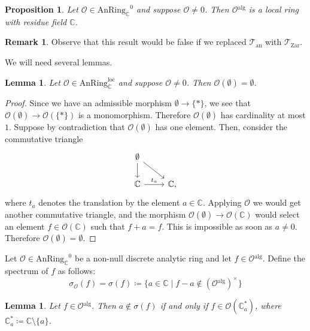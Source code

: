 \documentclass[12pt,a4paper,reqno]{amsart}
\theoremstyle{plain}
\newtheorem{lem}[thm]{Lemma}
\newtheorem{prop}[thm]{Proposition}
\theoremstyle{definition}
\newtheorem{rem}[thm]{Remark}
\theoremstyle{remark}
\numberwithin{equation}{section}
\begin{document}
\begin{prop} \label{prop:discrete_analytic_rings_augmented}
	Let ${\mathcal O} \in {\mathrm{AnRing}_{\mathbb C}}^0$ and suppose ${\mathcal O} \ne 0$. Then ${\mathcal O}{^\mathrm{alg}}$ is a local ring with residue field $\mathbb C$.
\end{prop}

\begin{rem}
	Observe that this result would be false if we replaced ${{\mathcal T}_{\mathrm{an}}}$ with ${\mathcal T}_{\mathrm{Zar}}$.
\end{rem}

We will need several lemmas.

\begin{lem}
	Let ${\mathcal O} \in {\mathrm{AnRing}^{\mathrm{loc}}_{\mathbb C}}$ and suppose ${\mathcal O} \ne 0$. Then ${\mathcal O}(\emptyset) = \emptyset$.
\end{lem}

\begin{proof}
	Since we have an admissible morphism $\emptyset \to \{*\}$, we see that ${\mathcal O}(\emptyset) \to {\mathcal O}(\{*\})$ is a monomorphism.
	Therefore ${\mathcal O}(\emptyset)$ has cardinality at most $1$. Suppose by contradiction that ${\mathcal O}(\emptyset)$ has one element.
	Then, consider the commutative triangle
	\[ \begin{tikzcd}
	\emptyset \arrow{d} \arrow{dr} \\
	\mathbb C \arrow{r}{t_a} & \mathbb C ,
	\end{tikzcd} \]
	where $t_a$ denotes the translation by the element $a \in \mathbb C$. Applying ${\mathcal O}$ we would get another commutative triangle, and the morphism ${\mathcal O}(\emptyset) \to {\mathcal O}(\mathbb C)$ would select an element $f \in {\mathcal O}(\mathbb C)$ such that $f + a = f$. This is impossible as soon as $a \ne 0$. Therefore ${\mathcal O}(\emptyset) = \emptyset$.
\end{proof}

Let ${\mathcal O} \in {\mathrm{AnRing}_{\mathbb C}}^0$ be a non-null discrete analytic ring and let $f \in {\mathcal O}{^\mathrm{alg}}$. Define the spectrum of $f$ as follows:
\[ \sigma_{\mathcal O}(f) = \sigma(f) \coloneqq \{a \in \mathbb C \mid f - a \not \in ({\mathcal O}{^\mathrm{alg}})^\times\} \]

\begin{lem} \label{lem:discrete_analytic_rings_invertible_elements}
	Let $f \in {\mathcal O}{^\mathrm{alg}}$. Then $a \not \in \sigma(f)$ if and only if $f \in {\mathcal O}(\mathbb C^*_a)$, where $\mathbb C^*_a \coloneqq \mathbb C \setminus \{a\}$.
\end{lem}
\end{document}
